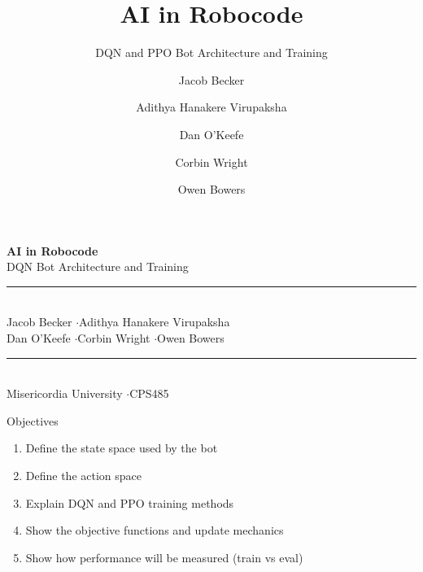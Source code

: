 \documentclass[12pt,aspectratio=169]{beamer}
\title[Robocode DQN]{AI in Robocode}
\subtitle{DQN and PPO Bot Architecture and Training}
\author[Becker \textit{et al.}]{
  Jacob Becker \and Adithya Hanakere Virupaksha \and Dan O'Keefe \and
  Corbin Wright \and Owen Bowers
}
\institute{Misericordia University}
\begin{document}
{
  \begin{frame}[plain]
    \centering
    \vspace{0.8cm}
    {\color{mublue}\Huge\textbf{AI in Robocode}}\\[0.3cm]
    {\large DQN Bot Architecture and Training}\\[0.4cm]
    {\color{mublue}\rule{0.75\textwidth}{0.8pt}}\\[0.4cm]
    {\normalsize
      Jacob Becker \quad$\cdot$\quad Adithya Hanakere Virupaksha\\[0.2cm]
      Dan O'Keefe \quad$\cdot$\quad Corbin Wright \quad$\cdot$\quad Owen Bowers
    }\\[0.4cm]
    {\color{mublue}\rule{0.75\textwidth}{0.8pt}}\\[0.3cm]
    {\small Misericordia University \quad$\cdot$\quad CPS485}
  \end{frame}
}

\begin{frame}{Objectives}
  \begin{enumerate}
    \item Define the state space used by the bot
    \item Define the action space
    \item Explain DQN and PPO training methods
    \item Show the objective functions and update mechanics
    \item Show how performance will be measured (train vs eval)
  \end{enumerate}
\end{frame}
\end{document}
